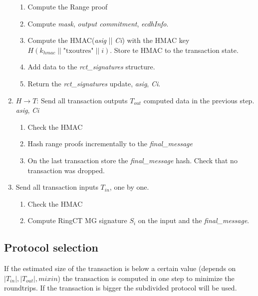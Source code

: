 \documentclass[]{article}
\begin{document}
\begin{enumerate}
\begin{enumerate}
		\item Compute the Range proof 
		
		\item Compute \emph{mask}, \emph{output commitment}, \emph{ecdhInfo}.
		
		\item Compute the HMAC(\emph{asig} || \emph{Ci}) with the HMAC key $H(k_{hmac} \; || \; \text{"txoutres"} \; || \; i)$. Store te HMAC to the transaction state.
		
		\item Add data to the \emph{rct\_signatures} structure.
		
		\item Return the \emph{rct\_signatures} update, \emph{asig}, \emph{Ci}.
	\end{enumerate}

	\item $H \rightarrow T$: Send all transaction outputs $T_{out}$ computed data in the previous step. \emph{asig}, \emph{Ci}
	\begin{enumerate}
		\item Check the HMAC
		
		\item Hash range proofs incrementally to the \emph{final\_message}
		
		\item On the last transaction store the \emph{final\_message} hash. Check that no transaction was dropped.
	\end{enumerate}

	\item Send all transaction inputs $T_{in}$, one by one.
	\begin{enumerate}
		\item Check the HMAC
		
		\item Compute RingCT MG signature $S_i$ on the input and the \emph{final\_message}.
		
	\end{enumerate} 
	
\end{enumerate}

\subsection{Protocol selection}
If the estimated size of the transaction is below a certain value (depends on $|T_{in}|, |T_{out}|, mixin$) the transaction is computed in one step to minimize the roundtrips. If the transaction is bigger the subdivided protocol will be used.
\end{document}
